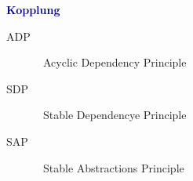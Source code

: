\textbf{\textcolor{darkblue}{Kopplung}}~
\begin{description}
	\item[\textsc{A}DP] \ \textcolor{mehrred}{A}cyclic Dependency Principle
	\item[\textsc{S}DP] \ \textcolor{mehrred}{S}table Dependencye Principle
	\item[\textsc{S}AP] \ \textcolor{mehrred}{S}table Abstractions Principle
\end{description}
